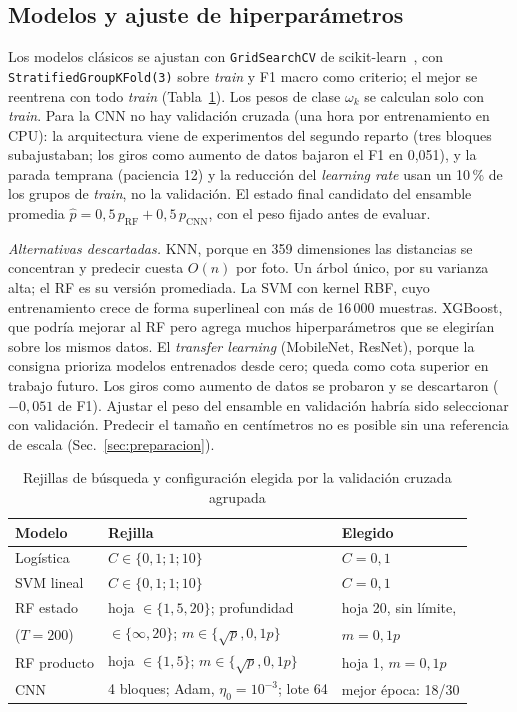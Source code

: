 \documentclass[conference]{IEEEtran}
\begin{document}
\subsection{Modelos y ajuste de hiperparámetros}

Los modelos clásicos se ajustan con \texttt{GridSearchCV} de scikit-learn~\cite{pedregosa2011}, con \texttt{StratifiedGroupKFold(3)} sobre \emph{train} y F1 macro como criterio; el mejor se reentrena con todo \emph{train} (Tabla~\ref{tab:rejillas}). Los pesos de clase $\omega_k$ se calculan solo con \emph{train}. Para la CNN no hay validación cruzada (una hora por entrenamiento en CPU): la arquitectura viene de experimentos del segundo reparto (tres bloques subajustaban; los giros como aumento de datos bajaron el F1 en 0,051), y la parada temprana (paciencia 12) y la reducción del \emph{learning rate} usan un 10\,\% de los grupos de \emph{train}, no la validación. El estado final candidato del ensamble promedia $\hat p=0{,}5\,p_{\text{RF}}+0{,}5\,p_{\text{CNN}}$, con el peso fijado antes de evaluar.

\emph{Alternativas descartadas.} KNN, porque en 359 dimensiones las distancias se concentran y predecir cuesta $O(n)$ por foto. Un árbol único, por su varianza alta; el RF es su versión promediada. La SVM con kernel RBF, cuyo entrenamiento crece de forma superlineal con más de 16\,000 muestras. XGBoost, que podría mejorar al RF pero agrega muchos hiperparámetros que se elegirían sobre los mismos datos. El \emph{transfer learning} (MobileNet, ResNet), porque la consigna prioriza modelos entrenados desde cero; queda como cota superior en trabajo futuro. Los giros como aumento de datos se probaron y se descartaron ($-0{,}051$ de F1). Ajustar el peso del ensamble en validación habría sido seleccionar con validación. Predecir el tamaño en centímetros no es posible sin una referencia de escala (Sec.~\ref{sec:preparacion}).

\begin{table}[t]
\caption{Rejillas de búsqueda y configuración elegida por la validación cruzada agrupada}
\label{tab:rejillas}
\centering
\scriptsize
\setlength{\tabcolsep}{2pt}
\begin{tabular}{@{}lll@{}}
\toprule
Modelo & Rejilla & Elegido\\
\midrule
Logística & $C\in\{0{,}1;1;10\}$ & $C=0{,}1$\\
SVM lineal & $C\in\{0{,}1;1;10\}$ & $C=0{,}1$\\
RF estado & hoja $\in\{1,5,20\}$; profundidad & hoja 20, sin límite,\\
($T=200$) & $\in\{\infty,20\}$; $m\in\{\sqrt{p},0{,}1p\}$ & $m=0{,}1p$\\
RF producto & hoja $\in\{1,5\}$; $m\in\{\sqrt{p},0{,}1p\}$ & hoja 1, $m=0{,}1p$\\
CNN & 4 bloques; Adam, $\eta_0=10^{-3}$; lote 64 & mejor época: 18/30\\
\bottomrule
\end{tabular}
\end{table}
\end{document}
